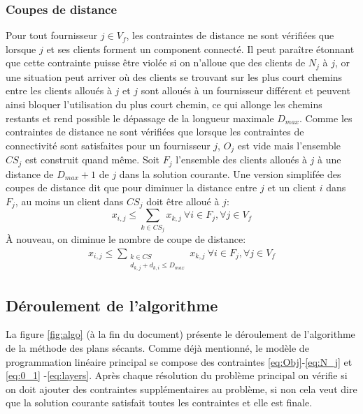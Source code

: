 \documentclass[12pt,a4paper]{article}
\begin{document}
\begin{multicols}{2}
\subsubsection*{Coupes de distance}
Pour tout fournisseur $j \in V_{f}$, les contraintes de distance ne sont vérifiées que lorsque $j$ et ses clients forment un component connecté. Il peut paraître étonnant que cette contrainte puisse être violée si on n'alloue que des clients de $N_{j}$ à $j$, or une situation peut arriver où des clients se trouvant sur les plus court chemins entre les clients alloués à $j$ et $j$ sont alloués à un fournisseur différent et peuvent ainsi bloquer l'utilisation du plus court chemin, ce qui allonge les chemins restants et rend possible le dépassage de la longueur maximale $D_{max}$.\newline \indent
Comme les contraintes de distance ne sont vérifiées que lorsque les contraintes de connectivité sont satisfaites pour un fournisseur $j$, $O_{j}$ est vide mais l'ensemble $CS_{j}$ est construit quand même. Soit $F_{j}$ l'ensemble des clients alloués à $j$ à une distance de $D_{max}+1$ de $j$ dans la solution courante.\newline \indent
Une version simplifée des coupes de distance dit que pour diminuer la distance entre $j$ et un client $i$ dans $F_{j}$, au moins un client dans $CS_{j}$ doit être alloué à $j$:
\begin{equation*}
x_{i,j} \leq \sum_{k \in CS_{j}}{x_{k,j}} \ \forall i \in F_{j}, \forall j \in V_{f}
\end{equation*}
À nouveau, on diminue le nombre de coupe de distance:
\begin{equation}
\begin{aligned}
x_{i,j} \leq \sum_{\substack{k \in CS \\d_{k,j}+d_{k,i}\leq D_{max}}}{x_{k,j}} \ \forall i \in F_{j}, \forall j \in V_{f}
\end{aligned}
\end{equation}

\subsection{Déroulement de l'algorithme}
La figure \ref{fig:algo} (à la fin du document) présente le déroulement de l'algorithme de la méthode des plans sécants. Comme déjà mentionné, le modèle de programmation linéaire principal se compose des contraintes \eqref{eq:Obj}-\eqref{eq:N_j} et \eqref{eq:0_1} -\eqref{eq:layers}. Après chaque résolution du problème principal on vérifie si on doit ajouter des contraintes supplémentaires au problème, si non cela veut dire que la solution courante satisfait toutes les contraintes et elle est finale.

\end{multicols}
\end{document}

